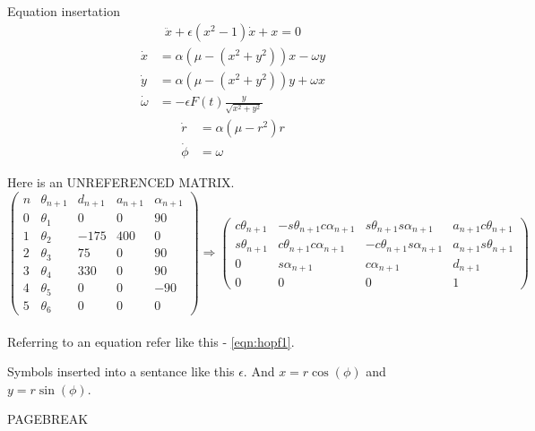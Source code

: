 \documentclass[12pt]{utscapstone}
\begin{document}
Equation insertation
\begin{align}
\ddot{x} + \epsilon(x^2 - 1)\dot{x} + x = 0
\end{align}
\begin{align}
\dot{x} &=  \alpha(\mu-(x^2+y^2))x - \omega y \label{eqn:hopf1}\\
\dot{y} &=  \alpha(\mu-(x^2 + y^2))y + \omega x \label{eqn:hopf2}\\
\dot{\omega} &= -\epsilon F(t)\frac{y}{\sqrt{x^2+y^2}} 
\end{align}
\begin{align}
\dot{r} &= \alpha(\mu-r^2)r\\
\dot{\phi} &= \omega
\end{align}

Here is an UNREFERENCED MATRIX.
 \[\left( \begin{array}{ccccc}
n & \theta_{n+1} & d_{n+1} & a_{n+1} & \alpha_{n+1}\\
0 & \theta_{1} & 0 & 0 & 90\\
1 & \theta_{2} & -175 & 400 & 0\\
2 & \theta_{3} & 75 & 0 & 90\\
3 & \theta_{4} & 330 & 0 & 90\\
4 & \theta_{5} & 0 & 0 & -90\\
5 & \theta_{6} & 0 & 0 & 0 \end{array} \right) \Rightarrow \left( \begin{array}{cccc}
c\theta_{n+1} & -s\theta_{n+1}c\alpha_{n+1} & s\theta_{n+1}s\alpha_{n+1} & a_{n+1}c\theta_{n+1}\\
s\theta_{n+1} & c\theta_{n+1}c\alpha_{n+1} & -c\theta_{n+1}s\alpha_{n+1}  & a_{n+1}s\theta_{n+1}\\
0 & s\alpha_{n+1} & c\alpha_{n+1} & d_{n+1}\\
0 & 0 & 0 & 1\end{array}\right)\]
\\

Referring to an equation
refer like this - \ref{eqn:hopf1}.

Symbols inserted into a sentance like this $\epsilon$. And \(x = r \cos(\phi)\) and \(y = r \sin(\phi)\).

\pagebreak
PAGEBREAK
\end{document}
